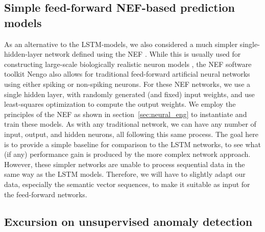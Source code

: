 \subsection{Simple feed-forward \acs{NEF}-based prediction models}%
\label{subsec:simple_feed_forward_nef_based_prediction_models}

As an alternative to the \ac{LSTM}-models, we also considered a much simpler single-hidden-layer network defined using the \acf{NEF} \parencite{Eliasmith2003}.
While this is usually used for constructing large-scale biologically realistic neuron models \parencite{Eliasmith2012}, the \ac{NEF} software toolkit \acs{Nengo} \parencite{Bekolay2014} also allows for traditional feed-forward artificial neural networks using either spiking or non-spiking neurons.
For these \ac{NEF} networks, we use a single hidden layer, with randomly generated (and fixed) input weights, and use least-squares optimization to compute the output weights.
We employ the principles of the \ac{NEF} as shown in section~\ref{sec:neural_eng} to instantiate and train these models.
As with any traditional network, we can have any number of input, output, and hidden neurons, all following this same process.
The goal here is to provide a simple baseline for comparison to the \ac{LSTM} networks, to see what (if any) performance gain is produced by the more complex network approach.
However, these simpler networks are unable to process sequential data in the same way as the \ac{LSTM} models.
Therefore, we will have to slightly adapt our data, especially the semantic vector sequences, to make it suitable as input for the feed-forward networks.

\subsection{Excursion on unsupervised anomaly detection}%
\label{subsec:excursion_on_unsupervised_anomaly_detection}

